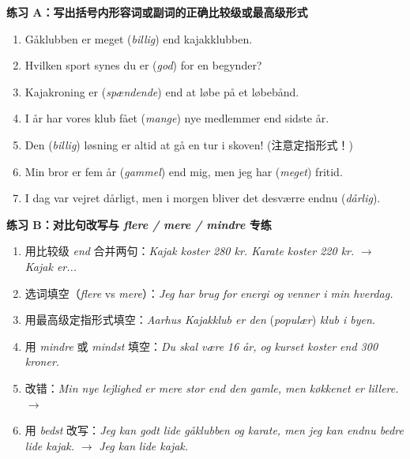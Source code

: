 \textbf{练习 A：写出括号内形容词或副词的正确比较级或最高级形式}
\begin{enumerate}
  \item Gåklubben er meget \underline{\hspace{2.2cm}} (\textit{billig}) end kajakklubben.
  \item Hvilken sport synes du er \underline{\hspace{2.2cm}} (\textit{god}) for en begynder?
  \item Kajakroning er \underline{\hspace{2.8cm}} (\textit{spændende}) end at løbe på et løbebånd.
  \item I år har vores klub fået \underline{\hspace{2.2cm}} (\textit{mange}) nye medlemmer end sidste år.
  \item Den \underline{\hspace{2.2cm}} (\textit{billig}) løsning er altid at gå en tur i skoven! (注意定指形式！)
  \item Min bror er fem år \underline{\hspace{2.2cm}} (\textit{gammel}) end mig, men jeg har \underline{\hspace{2.2cm}} (\textit{meget}) fritid.
  \item I dag var vejret dårligt, men i morgen bliver det desværre endnu \underline{\hspace{2.2cm}} (\textit{dårlig}).
\end{enumerate}

\textbf{练习 B：对比句改写与 \textit{flere / mere / mindre} 专练}
\begin{enumerate}
  \item 用比较级 \textit{end} 合并两句：\textit{Kajak koster 280 kr. Karate koster 220 kr.} $\rightarrow$ \textit{Kajak er...}
  \item 选词填空（\textit{flere} vs \textit{mere}）：\textit{Jeg har brug for} \underline{\hspace{1.8cm}} \textit{energi og} \underline{\hspace{1.8cm}} \textit{venner i min hverdag.}
  \item 用最高级定指形式填空：\textit{Aarhus Kajakklub er den} \underline{\hspace{2.8cm}} (\textit{populær}) \textit{klub i byen.}
  \item 用 \textit{mindre} 或 \textit{mindst} 填空：\textit{Du skal være} \underline{\hspace{1.8cm}} \textit{16 år, og kurset koster} \underline{\hspace{1.8cm}} \textit{end 300 kroner.}
  \item 改错：\textit{Min nye lejlighed er mere stor end den gamle, men køkkenet er lillere.} $\rightarrow$
  \item 用 \textit{bedst} 改写：\textit{Jeg kan godt lide gåklubben og karate, men jeg kan endnu bedre lide kajak.} $\rightarrow$ \textit{Jeg kan} \underline{\hspace{2.0cm}} \textit{lide kajak.}
\end{enumerate}

